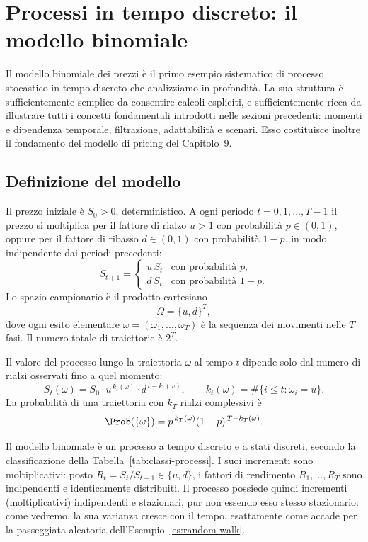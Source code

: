 \section{Processi in tempo discreto: il modello binomiale}
\label{sec:binomiale}

Il modello binomiale dei prezzi \`{e} il primo esempio sistematico di
processo stocastico in tempo discreto che analizziamo in profondit\`{a}.
La sua struttura \`{e} sufficientemente semplice da consentire calcoli
espliciti, e sufficientemente ricca da illustrare tutti i concetti
fondamentali introdotti nelle sezioni precedenti: momenti e dipendenza
temporale, filtrazione, adattabilit\`{a} e scenari. Esso costituisce
inoltre il fondamento del modello di pricing del Capitolo~9.

\subsection{Definizione del modello}

\noindent
Il prezzo iniziale \`{e} $S_0>0$, deterministico. A ogni periodo
$t=0,1,\ldots,T-1$ il prezzo si moltiplica per il fattore di rialzo
$u>1$ con probabilit\`{a} $p\in(0,1)$, oppure per il fattore di
ribasso $d\in(0,1)$ con probabilit\`{a} $1-p$, in modo indipendente
dai periodi precedenti:
\[
S_{t+1}=\begin{cases}
u\,S_t & \text{con probabilit\`{a} }p,\\
d\,S_t & \text{con probabilit\`{a} }1-p.
\end{cases}
\]
Lo spazio campionario \`{e} il prodotto cartesiano
\[
\Omega=\{u,d\}^T,
\]
dove ogni esito elementare $\omega=(\omega_1,\ldots,\omega_T)$ \`{e} la
sequenza dei movimenti nelle $T$ fasi. Il numero totale di traiettorie
\`{e} $2^T$.

Il valore del processo lungo la traiettoria $\omega$ al tempo $t$
dipende solo dal numero di rialzi osservati fino a quel momento:
\[
S_t(\omega)=S_0\cdot u^{\,k_t(\omega)}\cdot d^{\,t-k_t(\omega)},
\qquad k_t(\omega)=\#\{i\leq t:\omega_i=u\}.
\]
La probabilit\`{a} di una traiettoria con $k_T$ rialzi complessivi
\`{e}
\[
\Prob(\{\omega\})=p^{\,k_T(\omega)}(1-p)^{\,T-k_T(\omega)}.
\]

Il modello binomiale \`{e} un processo a tempo discreto e a stati
discreti, secondo la classificazione della
Tabella~\ref{tab:classi-processi}. I suoi incrementi sono
moltiplicativi: posto $R_t=S_t/S_{t-1}\in\{u,d\}$, i fattori di
rendimento $R_1,\ldots,R_T$ sono indipendenti e identicamente
distribuiti. Il processo possiede quindi incrementi (moltiplicativi)
indipendenti e stazionari, pur non essendo esso stesso stazionario:
come vedremo, la sua varianza cresce con il tempo, esattamente come
accade per la passeggiata aleatoria dell'Esempio~\ref{es:random-walk}.


